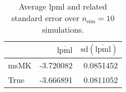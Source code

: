 \begin{table}[H]

\caption{Average lpml and related standard error over $n_{\text{sim}} = 10$ simulations.}
\centering
\begin{tabular}[t]{lrr}
\toprule
  & $\overbar{\text{lpml}}$ & $\text{sd}(\overbar{\text{lpml}})$\\
\midrule
msMK & -3.720082 & 0.0851452\\
True & -3.666891 & 0.0811052\\
\bottomrule
\end{tabular}
\end{table}